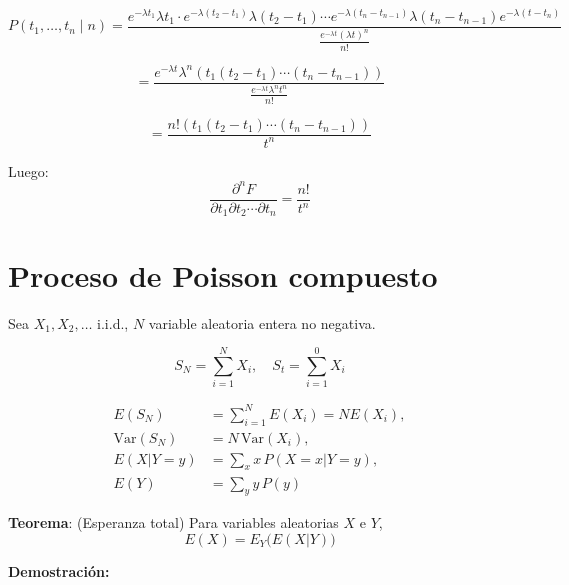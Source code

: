 \documentclass[12pt,a4paper]{article}
\newcommand{\teorema}[1]{%
\begin{teoremabox}
\textbf{Teorema}: #1
\end{teoremabox}
}
\begin{document}
\begin{equation*}
P(t_1, \ldots, t_n \mid n) = \frac{e^{-\lambda t_1} \lambda t_1 \cdot e^{-\lambda(t_2-t_1)} \lambda(t_2-t_1) \cdots e^{-\lambda(t_n-t_{n-1})} \lambda(t_n-t_{n-1}) e^{-\lambda(t-t_n)}}{\frac{e^{-\lambda t} (\lambda t)^n}{n!}}
\end{equation*}

\begin{equation*}
= \frac{e^{-\lambda t} \lambda^n (t_1(t_2-t_1)\cdots(t_n-t_{n-1}))}{\frac{e^{-\lambda t} \lambda^n t^n}{n!}}
\end{equation*}

\begin{equation*}
= \frac{n! (t_1(t_2-t_1)\cdots(t_n-t_{n-1}))}{t^n}
\end{equation*}

Luego:
\begin{equation*}
\frac{\partial^n F}{\partial t_1 \partial t_2 \cdots \partial t_n} = \frac{n!}{t^n}
\end{equation*}





\section{Proceso de Poisson compuesto}

Sea $X_1, X_2, \ldots$ i.i.d., $N$ variable aleatoria entera no negativa.

\begin{equation*}
  S_N = \sum_{i=1}^{N} X_i, \quad S_t = \sum_{i=1}^{0} X_i
\end{equation*}

\begin{align*}
E(S_N) &= \sum_{i=1}^{N} E(X_i) = N E(X_i), \\
\mathrm{Var}(S_N) &= N\, \mathrm{Var}(X_i), \\
E(X|Y=y) &= \sum_{x} x\, P(X=x|Y=y), \\
E(Y) &= \sum_{y} y\, P(y)
\end{align*}


\teorema{(Esperanza total) Para variables aleatorias $X$ e $Y$,
\begin{equation*}
E(X) = E_Y\big(E(X|Y)\big)
\end{equation*}
}

\textbf{Demostración:}
\end{document}
